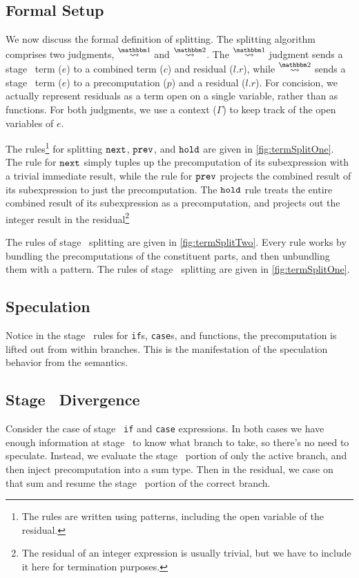 \subsection {Formal Setup}

We now discuss the formal definition of splitting.
The splitting algorithm comprises two judgments, $\splitonesym$ and $\splittwosym$.
The $\splitonesym$ judgment sends a stage \bbone\ term ($e$) to a combined term ($c$) and residual ($l.r$),
while $\splittwosym$ sends a stage \bbtwo\ term ($e$) to a precomputation ($p$) and a residual ($l.r$).
For concision, we actually represent residuals as a term open on a single variable, rather than as functions.
For both judgments, we use a context ($\Gamma$) to keep track of the open variables of $e$.

The rules\footnote{The rules are written using patterns, including the open variable of the residual.} 
for splitting ${\tt next}$, ${\tt prev}$, and ${\tt hold}$ are given in \ref{fig:termSplitOne}.
The rule for ${\tt next}$ simply tuples up the precomputation of its subexpression with a trivial immediate result,
while the rule for ${\tt prev}$ projects the combined result of its subexpression to just the precomputation.
The ${\tt hold}$ rule treats the entire combined result of its subexpression as a precomputation, 
and projects out the integer result in the residual\footnote{The residual of an integer expression is usually trivial, 
but we have to include it here for termination purposes.}

The rules of stage \bbtwo\ splitting are given in \ref{fig:termSplitTwo}.  
Every rule works by bundling the precomputations of the constituent parts, and then unbundling them with a pattern.
The rules of stage \bbone\ splitting are given in \ref{fig:termSplitOne}.  


\subsection {Speculation}

Notice in the stage \bbtwo\ rules for {\tt if}s, {\tt case}s, and functions, the precomputation is lifted out from within branches.
This is the manifestation of the speculation behavior from the semantics.

\subsection {Stage \bbone\ Divergence}
Consider the case of stage \bbone\ {\tt if} and {\tt case} expressions.
In both cases we have enough information at stage \bbone\ to know what branch to take, so there's no need to speculate.
Instead, we evaluate the stage \bbone\ portion of only the active branch, and then inject precomputation into a sum type.
Then in the residual, we case on that sum and resume the stage \bbtwo\ portion of the correct branch.

